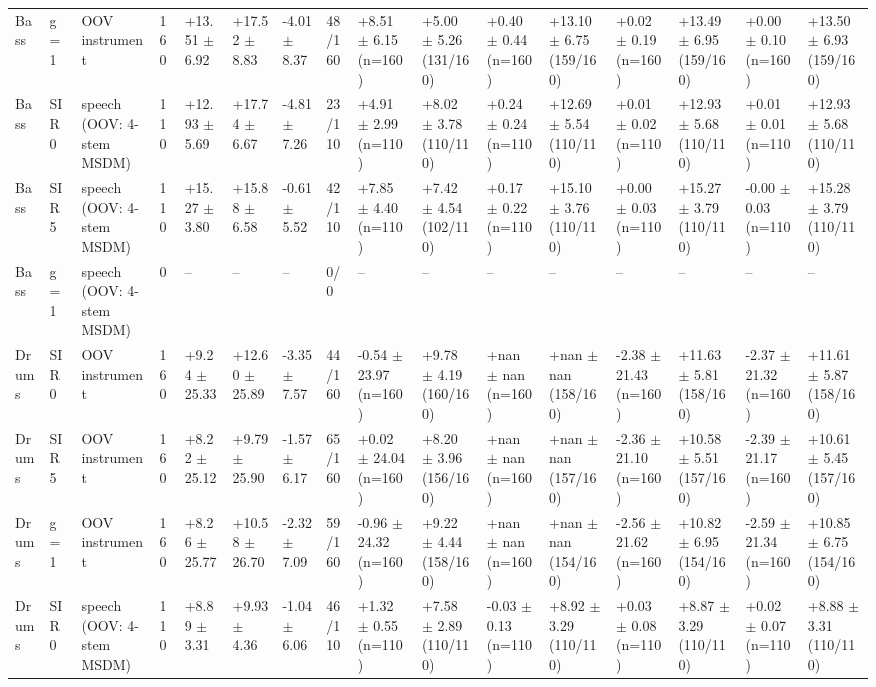 \begin{tabular}{llllllllllllllll}
Bass & g = 1 & OOV instrument & 160 & +13.51 $\pm$ 6.92 & +17.52 $\pm$ 8.83 & -4.01 $\pm$ 8.37 & 48/160 & +8.51 $\pm$ 6.15 (n=160) & +5.00 $\pm$ 5.26 (131/160) & +0.40 $\pm$ 0.44 (n=160) & +13.10 $\pm$ 6.75 (159/160) & +0.02 $\pm$ 0.19 (n=160) & +13.49 $\pm$ 6.95 (159/160) & +0.00 $\pm$ 0.10 (n=160) & +13.50 $\pm$ 6.93 (159/160)\\
Bass & SIR 0 & speech (OOV: 4-stem MSDM) & 110 & +12.93 $\pm$ 5.69 & +17.74 $\pm$ 6.67 & -4.81 $\pm$ 7.26 & 23/110 & +4.91 $\pm$ 2.99 (n=110) & +8.02 $\pm$ 3.78 (110/110) & +0.24 $\pm$ 0.24 (n=110) & +12.69 $\pm$ 5.54 (110/110) & +0.01 $\pm$ 0.02 (n=110) & +12.93 $\pm$ 5.68 (110/110) & +0.01 $\pm$ 0.01 (n=110) & +12.93 $\pm$ 5.68 (110/110)\\
Bass & SIR 5 & speech (OOV: 4-stem MSDM) & 110 & +15.27 $\pm$ 3.80 & +15.88 $\pm$ 6.58 & -0.61 $\pm$ 5.52 & 42/110 & +7.85 $\pm$ 4.40 (n=110) & +7.42 $\pm$ 4.54 (102/110) & +0.17 $\pm$ 0.22 (n=110) & +15.10 $\pm$ 3.76 (110/110) & +0.00 $\pm$ 0.03 (n=110) & +15.27 $\pm$ 3.79 (110/110) & -0.00 $\pm$ 0.03 (n=110) & +15.28 $\pm$ 3.79 (110/110)\\
Bass & g = 1 & speech (OOV: 4-stem MSDM) & 0 & -- & -- & -- & 0/0 & -- & -- & -- & -- & -- & -- & -- & --\\
Drums & SIR 0 & OOV instrument & 160 & +9.24 $\pm$ 25.33 & +12.60 $\pm$ 25.89 & -3.35 $\pm$ 7.57 & 44/160 & -0.54 $\pm$ 23.97 (n=160) & +9.78 $\pm$ 4.19 (160/160) & +nan $\pm$ nan (n=160) & +nan $\pm$ nan (158/160) & -2.38 $\pm$ 21.43 (n=160) & +11.63 $\pm$ 5.81 (158/160) & -2.37 $\pm$ 21.32 (n=160) & +11.61 $\pm$ 5.87 (158/160)\\
Drums & SIR 5 & OOV instrument & 160 & +8.22 $\pm$ 25.12 & +9.79 $\pm$ 25.90 & -1.57 $\pm$ 6.17 & 65/160 & +0.02 $\pm$ 24.04 (n=160) & +8.20 $\pm$ 3.96 (156/160) & +nan $\pm$ nan (n=160) & +nan $\pm$ nan (157/160) & -2.36 $\pm$ 21.10 (n=160) & +10.58 $\pm$ 5.51 (157/160) & -2.39 $\pm$ 21.17 (n=160) & +10.61 $\pm$ 5.45 (157/160)\\
Drums & g = 1 & OOV instrument & 160 & +8.26 $\pm$ 25.77 & +10.58 $\pm$ 26.70 & -2.32 $\pm$ 7.09 & 59/160 & -0.96 $\pm$ 24.32 (n=160) & +9.22 $\pm$ 4.44 (158/160) & +nan $\pm$ nan (n=160) & +nan $\pm$ nan (154/160) & -2.56 $\pm$ 21.62 (n=160) & +10.82 $\pm$ 6.95 (154/160) & -2.59 $\pm$ 21.34 (n=160) & +10.85 $\pm$ 6.75 (154/160)\\
Drums & SIR 0 & speech (OOV: 4-stem MSDM) & 110 & +8.89 $\pm$ 3.31 & +9.93 $\pm$ 4.36 & -1.04 $\pm$ 6.06 & 46/110 & +1.32 $\pm$ 0.55 (n=110) & +7.58 $\pm$ 2.89 (110/110) & -0.03 $\pm$ 0.13 (n=110) & +8.92 $\pm$ 3.29 (110/110) & +0.03 $\pm$ 0.08 (n=110) & +8.87 $\pm$ 3.29 (110/110) & +0.02 $\pm$ 0.07 (n=110) & +8.88 $\pm$ 3.31 (110/110)\\

\end{tabular}
